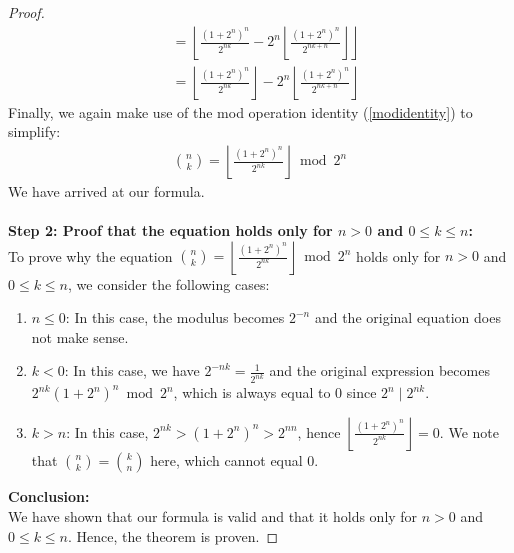 \documentclass{article}
\theoremstyle{plain}
\begin{document}
\begin{proof}
\begin{align}
&= \left\lfloor\frac{(1 + 2^{n})^{n}}{2^{n k}} - 2^{n} \left\lfloor \frac{(1 + 2^{n})^{n}}{2^{n k + n}} \right\rfloor\right\rfloor \\
&= \left\lfloor\frac{(1 + 2^{n})^{n}}{2^{n k}}\right\rfloor - 2^{n} \left\lfloor \frac{(1 + 2^{n})^{n}}{2^{n k + n}} \right\rfloor
\end{align}
Finally, we again make use of the mod operation identity (\ref{modidentity}) to simplify:
\begin{align}
\binom{n}{k} = \left\lfloor\frac{(1 + 2^{n})^{n}}{2^{n k}}\right\rfloor \bmod{2^{n}}
\end{align}
We have arrived at our formula.
\\
\\
\textbf{Step 2: Proof that the equation holds only for $n > 0$ and $0 \leq k \leq n$:}
\\
To prove why the equation $\binom{n}{k} = \left\lfloor\frac{(1 + 2^n)^n}{2^{nk}}\right\rfloor \bmod{2^n}$ holds only for $n > 0$ and $0 \leq k \leq n$, we consider the following cases:

\begin{enumerate}
\item $n \leq 0$: In this case, the modulus becomes $2^{-n}$ and the original equation does not make sense.

\item $k < 0$: In this case, we have $2^{-nk} = \frac{1}{2^{nk}}$ and the original expression becomes $2^{nk} (1 + 2^n)^n \bmod{2^n}$, which is always equal to $0$ since $2^{n} \mid 2^{nk}$.

\item $k > n$: In this case, $2^{nk} > (1 + 2^n)^n > 2^{nn}$, hence $\left\lfloor\frac{(1 + 2^n)^n}{2^{nk}}\right\rfloor = 0$. We note that $\binom{n}{k} = \binom{k}{n}$ here, which cannot equal $0$.
\end{enumerate}
\noindent
\textbf{Conclusion:}
\\
We have shown that our formula is valid and that it holds only for $n > 0$ and $0 \leq k \leq n$. Hence, the theorem is proven.
\end{proof}
\end{document}

